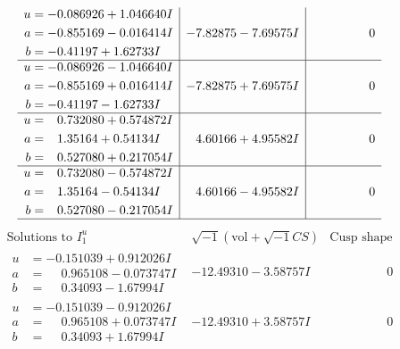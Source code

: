 \documentclass[1p]{elsarticle_modified}
\theoremstyle{definition}
\newcommand{\I}{\sqrt{-1}}
\begin{document}
$$\begin{array}{c|c|c}
\begin{aligned}
u &= -0.086926 + 1.046640 I \\
a &= -0.855169 - 0.016414 I \\
b &= -0.41197 + 1.62733 I\end{aligned}
 & -7.82875 - 7.69575 I & \phantom{-0.000000 } 0 \\ \hline\begin{aligned}
u &= -0.086926 - 1.046640 I \\
a &= -0.855169 + 0.016414 I \\
b &= -0.41197 - 1.62733 I\end{aligned}
 & -7.82875 + 7.69575 I & \phantom{-0.000000 } 0 \\ \hline\begin{aligned}
u &= \phantom{-}0.732080 + 0.574872 I \\
a &= \phantom{-}1.35164 + 0.54134 I \\
b &= \phantom{-}0.527080 + 0.217054 I\end{aligned}
 & \phantom{-}4.60166 + 4.95582 I & \phantom{-0.000000 } 0 \\ \hline\begin{aligned}
u &= \phantom{-}0.732080 - 0.574872 I \\
a &= \phantom{-}1.35164 - 0.54134 I \\
b &= \phantom{-}0.527080 - 0.217054 I\end{aligned}
 & \phantom{-}4.60166 - 4.95582 I & \phantom{-0.000000 } 0\\
 \hline 
 \end{array}$$\newpage$$\begin{array}{c|c|c}  
\text{Solutions to }I^u_{1}& \I (\text{vol} + \sqrt{-1}CS) & \text{Cusp shape}\\
 \hline 
\begin{aligned}
u &= -0.151039 + 0.912026 I \\
a &= \phantom{-}0.965108 - 0.073747 I \\
b &= \phantom{-}0.34093 - 1.67994 I\end{aligned}
 & -12.49310 - 3.58757 I & \phantom{-0.000000 } 0 \\ \hline\begin{aligned}
u &= -0.151039 - 0.912026 I \\
a &= \phantom{-}0.965108 + 0.073747 I \\
b &= \phantom{-}0.34093 + 1.67994 I\end{aligned}
 & -12.49310 + 3.58757 I & \phantom{-0.000000 } 0 \\ \hline\begin{aligned}

\end{aligned}
\end{array}$$
\end{document}
